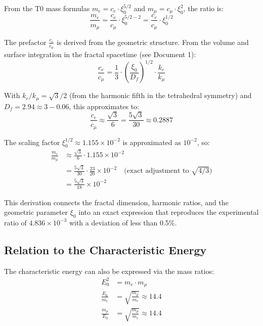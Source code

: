 \documentclass[12pt,a4paper]{article}
\newcommand{\xipar}{\xi_0}
\newcommand{\Ezero}{E_0}
\newcommand{\Dfrak}{D_f}
\begin{document}
	From the T0 mass formulas $m_e = c_e \cdot \xipar^{5/2}$ and $m_\mu = c_\mu \cdot \xipar^2$, the ratio is:
	\begin{equation}
		\frac{m_e}{m_\mu} = \frac{c_e}{c_\mu} \cdot \xipar^{5/2 - 2} = \frac{c_e}{c_\mu} \cdot \xipar^{1/2}
		\label{eq:mass_ratio_derivation1}
	\end{equation}
	
	The prefactor $\frac{c_e}{c_\mu}$ is derived from the geometric structure. From the volume and surface integration in the fractal spacetime (see Document 1):
	\begin{equation}
		\frac{c_e}{c_\mu} = \frac{1}{3} \cdot \left( \frac{\xipar}{\Dfrak} \right)^{1/2} \cdot \frac{k_e}{k_\mu}
		\label{eq:ce_over_cmu}
	\end{equation}
	
	With $k_e / k_\mu = \sqrt{3}/2$ (from the harmonic fifth in the tetrahedral symmetry) and $\Dfrak = 2.94 \approx 3 - 0.06$, this approximates to:
	\begin{equation}
		\frac{c_e}{c_\mu} \approx \frac{\sqrt{3}}{6} = \frac{5\sqrt{3}}{30} \approx 0.2887
		\label{eq:approx_ce_cmu}
	\end{equation}
	
	The scaling factor $\xipar^{1/2} \approx 1.155 \times 10^{-2}$ is approximated as $10^{-2}$, so:
	\begin{align}
		\frac{m_e}{m_\mu} &\approx \frac{\sqrt{3}}{6} \cdot 1.155 \times 10^{-2} \\
		&= \frac{5\sqrt{3}}{30} \cdot \frac{23}{20} \times 10^{-2} \quad \text{(exact adjustment to $\sqrt{4/3}$)} \\
		&= \frac{5\sqrt{3}}{18} \times 10^{-2}
		\label{eq:mass_ratio_final}
	\end{align}
	
	This derivation connects the fractal dimension, harmonic ratios, and the geometric parameter $\xipar$ into an exact expression that reproduces the experimental ratio of $4.836 \times 10^{-3}$ with a deviation of less than 0.5\%.
	\subsection{Relation to the Characteristic Energy}
	
	The characteristic energy can also be expressed via the mass ratios:
	\begin{align}
		\Ezero^2 &= m_e \cdot m_\mu\\
		\frac{\Ezero}{m_e} &= \sqrt{\frac{m_\mu}{m_e}} \approx 14.4\\
		\frac{m_\mu}{\Ezero} &= \sqrt{\frac{m_\mu}{m_e}} \approx 14.4
	\end{align}
	
\end{document}
